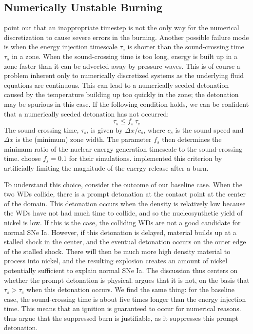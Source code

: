 \documentclass[twocolumn,numberedappendix]{../aastex62}
\begin{document}
\subsection{Numerically Unstable Burning}
\label{sec:unstable_burning}

\citet{kushnir:2013} point out that an inappropriate timestep is 
not the only way for the numerical discretization to cause 
severe errors in the burning. Another possible failure mode is when
the energy injection timescale
$\tau_e$ is shorter than the sound-crossing time $\tau_s$ in a zone.
When the sound-crossing time is too long, energy is built up in
a zone faster than it can be advected away by pressure waves.
This is of course a problem inherent only to numerically discretized
systems as the underlying fluid equations are continuous.
This can lead to a numerically seeded detonation caused by the
temperature building up too quickly in the zone; the detonation
may be spurious in this case. If the following condition holds,
we can be confident that a numerically seeded detonation has not occurred:
\begin{equation}
  \tau_s \leq f_{s}\, \tau_e \label{eq:burning_limiter_2}
\end{equation}
The sound crossing time, $\tau_s$, is given by $\Delta x / c_s$, 
where $c_s$ is the sound speed and $\Delta x$ is the (minimum) 
zone width. The parameter $f_{s}$ then determines the minimum
ratio of the nuclear energy generation timescale to the 
sound-crossing time. \citet{kushnir:2013} choose $f_{s} = 0.1$ 
for their simulations. \citet{kushnir:2013} implemented this
criterion by artificially limiting the magnitude of the energy
release after a burn.

To understand this choice, consider the outcome of our baseline case.
When the two WDs collide, there is a prompt detonation
at the contact point at the center of the domain. This detonation occurs
when the density is relatively low because the WDs have not had much
time to collide, and so the nucleosynthetic yield of nickel is low. If
this is the case, the colliding WDs are not a good candidate for
normal SNe Ia. However, if this detonation is delayed, material builds
up at a stalled shock in the center, and the eventual detonation occurs
on the outer edge of the stalled shock. There will then be much more
high density material to process into nickel, and the resulting
explosion creates an amount of nickel potentially sufficient to explain
normal SNe Ia. The discussion thus centers on whether the prompt detonation
is physical. \citeauthor{kushnir:2013} argues that it is not, on the basis
that $\tau_s > \tau_e$ when this detonation occurs. We find the same thing:
for the baseline case, the sound-crossing time is about five times longer
than the energy injection time. This means that an ignition is guaranteed
to occur for numerical reasons. \citeauthor{kushnir:2013} thus argue that
the suppressed burn is justifiable, as it suppresses this prompt detonation.
\end{document}
